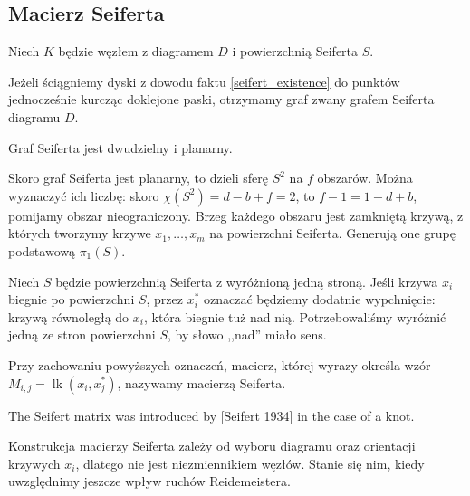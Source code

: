 \subsection{Macierz Seiferta}
Niech $K$ będzie węzłem z diagramem $D$ i powierzchnią Seiferta $S$.

\begin{definition}
    Jeżeli ściągniemy dyski z dowodu faktu \ref{seifert_existence} do punktów jednocześnie kurcząc doklejone paski, otrzymamy graf zwany grafem Seiferta diagramu $D$.
\end{definition}

\begin{proposition}
    Graf Seiferta jest dwudzielny i planarny.
\end{proposition}

Skoro graf Seiferta jest planarny, to dzieli sferę $S^2$ na $f$ obszarów.
Można wyznaczyć ich liczbę: skoro $\chi(S^2) = d - b + f = 2$, to $f - 1 = 1 - d + b$, pomijamy obszar nieograniczony.
Brzeg każdego obszaru jest zamkniętą krzywą, z których tworzymy krzywe $x_1, \ldots, x_m$ na powierzchni Seiferta.
Generują one grupę podstawową $\pi_1(S)$.

Niech $S$ będzie powierzchnią Seiferta z wyróżnioną jedną stroną.
Jeśli krzywa $x_i$ biegnie po powierzchni $S$, przez $x_i^*$ oznaczać będziemy dodatnie wypchnięcie: krzywą równoległą do $x_i$, która biegnie tuż nad nią.
Potrzebowaliśmy wyróżnić jedną ze stron powierzchni $S$, by słowo ,,nad'' miało sens.

\begin{definition}
    Przy zachowaniu powyższych oznaczeń, macierz, której wyrazy określa wzór $M_{i,j} = \operatorname{lk}(x_i, x_j^*)$, nazywamy macierzą Seiferta.
\end{definition}

\begin{tobedone}
The Seifert matrix was introduced by [Seifert 1934] in the case of a knot.
\end{tobedone}

Konstrukcja macierzy Seiferta zależy od wyboru diagramu oraz orientacji krzywych $x_i$, dlatego nie jest niezmiennikiem węzłów.
Stanie się nim, kiedy uwzględnimy jeszcze wpływ ruchów Reidemeistera.

